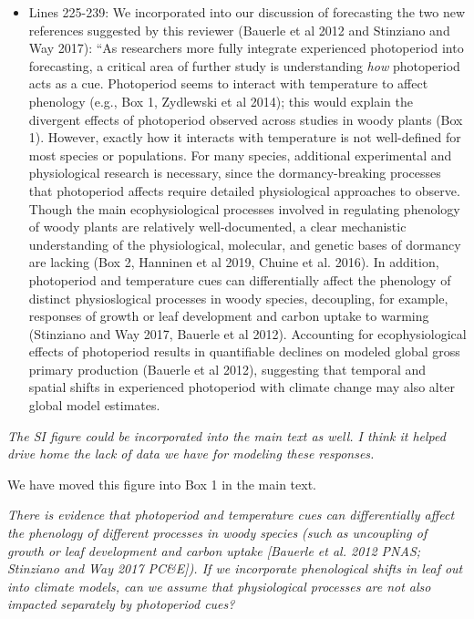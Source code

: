 \documentclass{article}
\begin{document}
\begin{itemize}
\item Lines 225-239: We incorporated into our discussion of forecasting the two new references suggested by this reviewer (Bauerle et al 2012 and Stinziano and Way 2017): ``As researchers more fully integrate experienced photoperiod into forecasting, a critical area of further study is understanding \emph{how} photoperiod acts as a cue. Photoperiod seems to interact with temperature to affect phenology (e.g., Box 1, Zydlewski et al 2014); this would explain the divergent effects of photoperiod observed across studies in woody plants (Box 1). However, exactly how it interacts with temperature is not well-defined for most species or populations. For many species, additional experimental and physiological research is necessary, since the dormancy-breaking processes that photoperiod affects require detailed physiological approaches to observe. Though the main ecophysiological processes involved in regulating phenology of woody plants are relatively well-documented, a clear mechanistic understanding of the physiological, molecular, and genetic bases of dormancy are lacking (Box 2, Hanninen et al 2019, Chuine et al. 2016). In addition, photoperiod and temperature cues can differentially affect the phenology of distinct physioslogical processes in woody species, decoupling, for example, responses of growth or leaf development and carbon uptake to warming (Stinziano and Way 2017, Bauerle et al 2012). Accounting for ecophysiological effects of photoperiod results in quantifiable declines on modeled global gross primary production (Bauerle et al 2012), suggesting that temporal and spatial shifts in experienced photoperiod with climate change may also alter global model estimates.

\end{itemize}
\par \emph{The SI figure could be incorporated into the main text as well. I think it helped drive home the lack of data we have for modeling these responses.}

\par We have moved this figure into Box 1 in the main text.

\par \emph{There is evidence that photoperiod and temperature cues can differentially affect the phenology of different processes in woody species (such as uncoupling of growth or leaf development and carbon uptake [Bauerle et al. 2012 PNAS; Stinziano and Way 2017 PC\&E]). If we incorporate phenological shifts in leaf out into climate models, can we assume that physiological processes are not also impacted separately by photoperiod cues?} 
\end{document}
